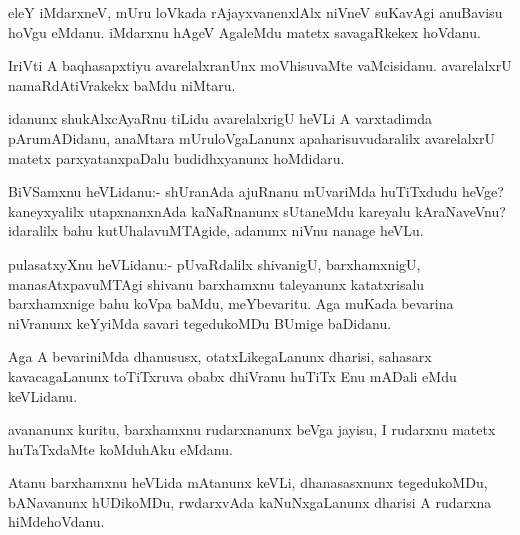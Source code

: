 \documentclass{article}
\begin{document}
\begin{mn}
eleY iMdarxneV, mUru loVkada rAjayxvanenxlAlx niVneV suKavAgi
anuBavisu hoVgu eMdanu. iMdarxnu hAgeV AgaleMdu matetx savagaRkekex hoVdanu.
\end{mn}

\begin{mn}
IriVti A baqhasapxtiyu avarelalxranUnx moVhisuvaMte
vaMcisidanu. avarelalxrU namaRdAtiVrakekx baMdu niMtaru.
\end{mn}

\begin{mn}
idanunx shukAlxcAyaRnu tiLidu avarelalxrigU heVLi A varxtadimda
pArumADidanu, anaMtara mUruloVgaLanunx apaharisuvudaralilx avarelalxrU
matetx parxyatanxpaDalu budidhxyanunx hoMdidaru.
\end{mn}

%
%


\begin{mn}%
BiVSamxnu heVLidanu:- shUranAda ajuRnanu mUvariMda huTiTxdudu heVge?
kaneyxyalilx utapxnanxnAda kaNaRnanunx sUtaneMdu kareyalu kAraNaveVnu?
idaralilx bahu kutUhalavuMTAgide, adanunx niVnu nanage heVLu.
\end{mn}

\begin{mn}
pulasatxyXnu heVLidanu:- pUvaRdalilx shivanigU, barxhamxnigU,
manasAtxpavuMTAgi shivanu barxhamxnu taleyanunx katatxrisalu
barxhamxnige bahu koVpa baMdu, meYbevaritu. Aga muKada bevarina
niVranunx keYyiMda savari tegedukoMDu BUmige baDidanu.
\end{mn}

\begin{mn}%
Aga A bevariniMda dhanususx, otatxLikegaLanunx dharisi, sahasarx
kavacagaLanunx toTiTxruva obabx dhiVranu huTiTx Enu mADali eMdu keVLidanu.
\end{mn}

\begin{mn}
avananunx kuritu, barxhamxnu rudarxnanunx beVga jayisu, I rudarxnu
matetx huTaTxdaMte koMduhAku eMdanu.
\end{mn}

\begin{mn}
Atanu barxhamxnu heVLida mAtanunx keVLi, dhanasasxnunx tegedukoMDu,
bANavanunx hUDikoMDu, rwdarxvAda kaNuNxgaLanunx dharisi A rudarxna hiMdehoVdanu.
\end{mn}
\end{document}
